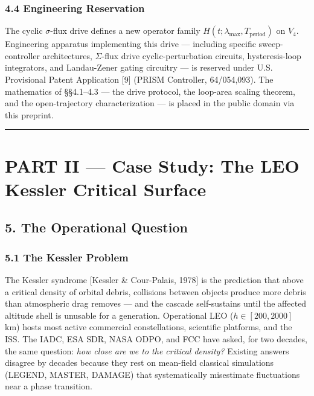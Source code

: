 \documentclass[
]{article}
\begin{document}
\subsubsection{4.4 Engineering
Reservation}\label{engineering-reservation-1}

The cyclic \(\sigma\)-flux drive defines a new operator family
\(H(t; \lambda_\text{max}, T_\text{period})\) on \(V_4\). Engineering
apparatus implementing this drive --- including specific
sweep-controller architectures, \(\Sigma\)-flux drive
cyclic-perturbation circuits, hysteresis-loop integrators, and
Landau-Zener gating circuitry --- is reserved under U.S. Provisional
Patent Application {[}9{]} (PRISM Controller, 64/054,093). The
mathematics of §§4.1--4.3 --- the drive protocol, the loop-area scaling
theorem, and the open-trajectory characterization --- is placed in the
public domain via this preprint.

\begin{center}\rule{0.5\linewidth}{0.5pt}\end{center}

\section{PART II --- Case Study: The LEO Kessler Critical
Surface}\label{part-ii-case-study-the-leo-kessler-critical-surface}

\subsection{5. The Operational Question}\label{the-operational-question}

\subsubsection{5.1 The Kessler Problem}\label{the-kessler-problem}

The Kessler syndrome {[}Kessler \& Cour-Palais, 1978{]} is the
prediction that above a critical density of orbital debris, collisions
between objects produce more debris than atmospheric drag removes ---
and the cascade self-sustains until the affected altitude shell is
unusable for a generation. Operational LEO (\(h \in [200, 2000]\) km)
hosts most active commercial constellations, scientific platforms, and
the ISS. The IADC, ESA SDR, NASA ODPO, and FCC have asked, for two
decades, the same question: \emph{how close are we to the critical
density?} Existing answers disagree by decades because they rest on
mean-field classical simulations (LEGEND, MASTER, DAMAGE) that
systematically misestimate fluctuations near a phase transition.
\end{document}
